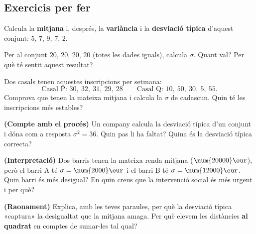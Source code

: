 \subsection{Exercicis per fer}

\begin{exercicis}
\begin{exlist}
  \item Calcula la \textbf{mitjana} i, després, la \textbf{variància} i la
        \textbf{desviació típica} d'aquest conjunt: $5$, $7$, $9$, $7$, $2$.
  \item Per al conjunt $20$, $20$, $20$, $20$ (totes les dades iguals), calcula
        $\sigma$. Quant val? Per què té sentit aquest resultat?
  \item Dos casals tenen aquestes inscripcions per setmana:
        \[
        \text{Casal P: } 30,\ 32,\ 31,\ 29,\ 28 \qquad
        \text{Casal Q: } 10,\ 50,\ 30,\ 5,\ 55.
        \]
        Comprova que tenen la mateixa mitjana i calcula la $\sigma$ de cadascun. Quin
        té les inscripcions més estables?
  \item \textbf{(Compte amb el procés)} Un company calcula la desviació típica d'un
        conjunt i dóna com a resposta $\sigma^2=36$. Quin pas li ha faltat? Quina és
        la desviació típica correcta?
  \item \textbf{(Interpretació)} Dos barris tenen la mateixa renda mitjana
        ($\num{20000}\eur$), però el barri A té $\sigma=\num{2000}\eur$ i el barri B
        té $\sigma=\num{12000}\eur$. Quin barri és més desigual? En quin creus que la
        intervenció social és més urgent i per què?
  \item \textbf{(Raonament)} Explica, amb les teves paraules, per què la desviació
        típica «captura» la desigualtat que la mitjana amaga. Per què elevem les
        distàncies \textbf{al quadrat} en comptes de sumar-les tal qual?
\end{exlist}
\end{exercicis}

